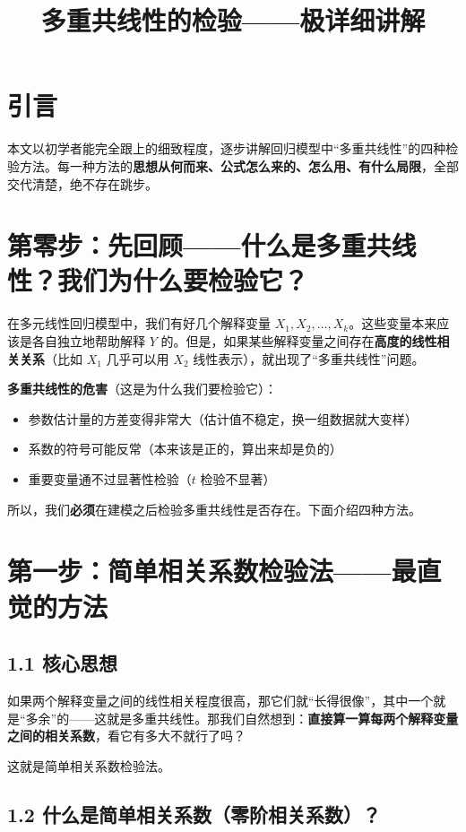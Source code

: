 \documentclass[12pt,a4paper]{ctexart}
\title{\textbf{多重共线性的检验——极详细讲解}}
\author{}
\date{}
\begin{document}
\maketitle

\section*{引言}

本文以初学者能完全跟上的细致程度，逐步讲解回归模型中“多重共线性”的四种检验方法。每一种方法的\textbf{思想从何而来、公式怎么来的、怎么用、有什么局限}，全部交代清楚，绝不存在跳步。

\section*{第零步：先回顾——什么是多重共线性？我们为什么要检验它？}

在多元线性回归模型中，我们有好几个解释变量 $X_1, X_2, \ldots, X_k$。这些变量本来应该是各自独立地帮助解释 $Y$ 的。但是，如果某些解释变量之间存在\textbf{高度的线性相关关系}（比如 $X_1$ 几乎可以用 $X_2$ 线性表示），就出现了“多重共线性”问题。

\textbf{多重共线性的危害}（这是为什么我们要检验它）：
\begin{itemize}
  \item 参数估计量的方差变得非常大（估计值不稳定，换一组数据就大变样）
  \item 系数的符号可能反常（本来该是正的，算出来却是负的）
  \item 重要变量通不过显著性检验（$t$ 检验不显著）
\end{itemize}

所以，我们\textbf{必须}在建模之后检验多重共线性是否存在。下面介绍四种方法。

\section*{第一步：简单相关系数检验法——最直觉的方法}

\subsection*{1.1 核心思想}

如果两个解释变量之间的线性相关程度很高，那它们就“长得很像”，其中一个就是“多余”的——这就是多重共线性。那我们自然想到：\textbf{直接算一算每两个解释变量之间的相关系数}，看它有多大不就行了吗？

这就是简单相关系数检验法。

\subsection*{1.2 什么是简单相关系数（零阶相关系数）？}
\end{document}
